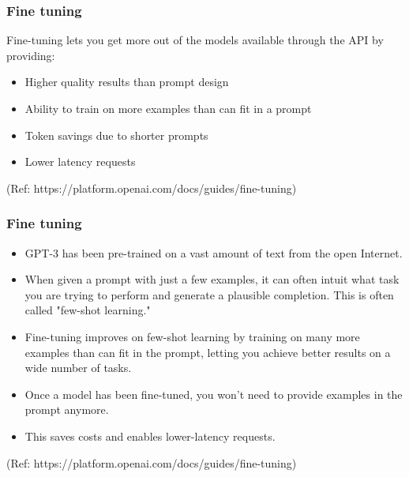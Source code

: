 \begin{frame}[fragile]\frametitle{Fine tuning}

Fine-tuning lets you get more out of the models available through the API by providing:

\begin{itemize}
\item Higher quality results than prompt design
\item Ability to train on more examples than can fit in a prompt
\item Token savings due to shorter prompts
\item Lower latency requests
\end{itemize}	 


{\tiny (Ref: https://platform.openai.com/docs/guides/fine-tuning)}
\end{frame}

\begin{frame}[fragile]\frametitle{Fine tuning}

\begin{itemize}
\item GPT-3 has been pre-trained on a vast amount of text from the open Internet. 
\item When given a prompt with just a few examples, it can often intuit what task you are trying to perform and generate a plausible completion. This is often called "few-shot learning."
\item Fine-tuning improves on few-shot learning by training on many more examples than can fit in the prompt, letting you achieve better results on a wide number of tasks. 
\item Once a model has been fine-tuned, you won't need to provide examples in the prompt anymore. 
\item This saves costs and enables lower-latency requests.
\end{itemize}	 


{\tiny (Ref: https://platform.openai.com/docs/guides/fine-tuning)}
\end{frame}

